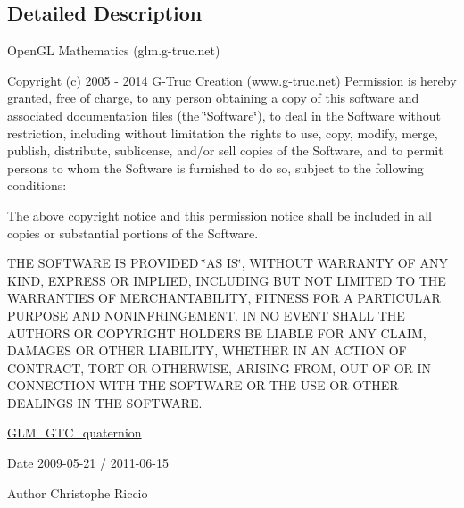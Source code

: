 \subsection{Detailed Description}
Open\+GL Mathematics (glm.\+g-\/truc.\+net)

Copyright (c) 2005 -\/ 2014 G-\/\+Truc Creation (www.\+g-\/truc.\+net) Permission is hereby granted, free of charge, to any person obtaining a copy of this software and associated documentation files (the \char`\"{}\+Software\char`\"{}), to deal in the Software without restriction, including without limitation the rights to use, copy, modify, merge, publish, distribute, sublicense, and/or sell copies of the Software, and to permit persons to whom the Software is furnished to do so, subject to the following conditions\+:

The above copyright notice and this permission notice shall be included in all copies or substantial portions of the Software.

T\+HE S\+O\+F\+T\+W\+A\+RE IS P\+R\+O\+V\+I\+D\+ED \char`\"{}\+A\+S I\+S\char`\"{}, W\+I\+T\+H\+O\+UT W\+A\+R\+R\+A\+N\+TY OF A\+NY K\+I\+ND, E\+X\+P\+R\+E\+SS OR I\+M\+P\+L\+I\+ED, I\+N\+C\+L\+U\+D\+I\+NG B\+UT N\+OT L\+I\+M\+I\+T\+ED TO T\+HE W\+A\+R\+R\+A\+N\+T\+I\+ES OF M\+E\+R\+C\+H\+A\+N\+T\+A\+B\+I\+L\+I\+TY, F\+I\+T\+N\+E\+SS F\+OR A P\+A\+R\+T\+I\+C\+U\+L\+AR P\+U\+R\+P\+O\+SE A\+ND N\+O\+N\+I\+N\+F\+R\+I\+N\+G\+E\+M\+E\+NT. IN NO E\+V\+E\+NT S\+H\+A\+LL T\+HE A\+U\+T\+H\+O\+RS OR C\+O\+P\+Y\+R\+I\+G\+HT H\+O\+L\+D\+E\+RS BE L\+I\+A\+B\+LE F\+OR A\+NY C\+L\+A\+IM, D\+A\+M\+A\+G\+ES OR O\+T\+H\+ER L\+I\+A\+B\+I\+L\+I\+TY, W\+H\+E\+T\+H\+ER IN AN A\+C\+T\+I\+ON OF C\+O\+N\+T\+R\+A\+CT, T\+O\+RT OR O\+T\+H\+E\+R\+W\+I\+SE, A\+R\+I\+S\+I\+NG F\+R\+OM, O\+UT OF OR IN C\+O\+N\+N\+E\+C\+T\+I\+ON W\+I\+TH T\+HE S\+O\+F\+T\+W\+A\+RE OR T\+HE U\+SE OR O\+T\+H\+ER D\+E\+A\+L\+I\+N\+GS IN T\+HE S\+O\+F\+T\+W\+A\+RE.

\hyperlink{group__gtc__quaternion}{G\+L\+M\+\_\+\+G\+T\+C\+\_\+quaternion}

\begin{DoxyDate}{Date}
2009-\/05-\/21 / 2011-\/06-\/15 
\end{DoxyDate}
\begin{DoxyAuthor}{Author}
Christophe Riccio 
\end{DoxyAuthor}

